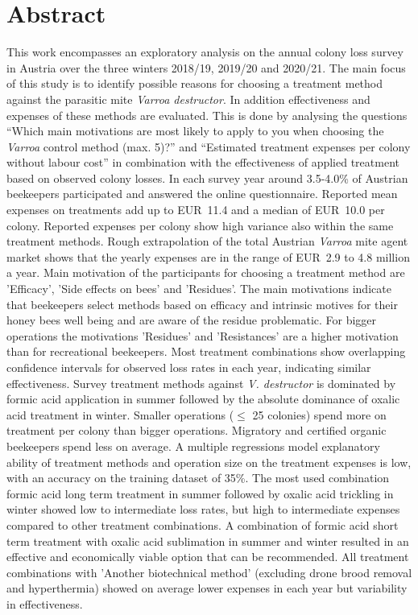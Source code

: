 \chapter*{Abstract}
\label{sec:abstract}
\vspace*{-10mm}

This work encompasses an exploratory analysis on the annual colony loss survey in Austria over the three winters 2018/19, 2019/20 and 2020/21. The main focus of this study is to identify possible reasons for choosing a treatment method against the parasitic mite \textit{Varroa destructor}. In addition effectiveness and expenses of these methods are evaluated. This is done by analysing the questions \enquote{Which main motivations are most likely to apply to you when choosing the \textit{Varroa} control method (max. 5)?} and \enquote{Estimated treatment expenses per colony without labour cost} in combination with the effectiveness of applied treatment based on observed colony losses. In each survey year around 3.5-4.0\% of Austrian beekeepers participated and answered the online questionnaire. Reported mean expenses on treatments add up to EUR~11.4 and a median of EUR~10.0 per colony. Reported expenses per colony show high variance also within the same treatment methods. Rough extrapolation of the total Austrian \textit{Varroa} mite agent market shows that the yearly expenses are in the range of EUR~2.9 to 4.8 million a year. Main motivation of the participants for choosing a treatment method are 'Efficacy', 'Side effects on bees' and 'Residues'. The main motivations indicate that beekeepers select methods based on efficacy and intrinsic motives for their honey bees well being and are aware of the residue problematic. For bigger operations the motivations 'Residues' and 'Resistances' are a higher motivation than for recreational beekeepers. Most treatment combinations show overlapping confidence intervals for observed loss rates in each year, indicating similar effectiveness. Survey treatment methods against \textit{V. destructor} is dominated by formic acid application in summer followed by the absolute dominance of oxalic acid treatment in winter. Smaller operations ($\leq$ 25 colonies) spend more on treatment per colony than bigger operations. Migratory and certified organic beekeepers spend less on average. A multiple regressions model explanatory ability of treatment methods and operation size on the treatment expenses is low, with an accuracy on the training dataset of 35\%. The most used combination formic acid long term treatment in summer followed by oxalic acid trickling in winter showed low to intermediate loss rates, but high to intermediate expenses compared to other treatment combinations. A combination of formic acid short term treatment with oxalic acid sublimation in summer and winter resulted in an effective and economically viable option that can be recommended. All treatment combinations with 'Another biotechnical method' (excluding drone brood removal and hyperthermia) showed on average lower expenses in each year but variability in effectiveness.
